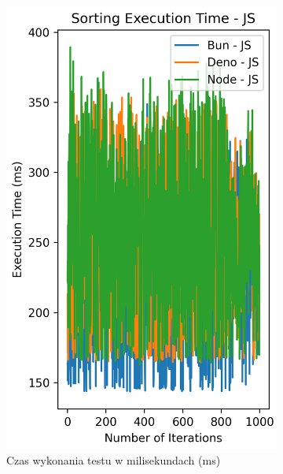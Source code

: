 \begin{figure}[H]
  \centering
  \begin{subfigure}[b]{0.4\textwidth}
    \centering
    \includegraphics[width=\textwidth]{Figures/sorting/sorting_bubble_1000_10000_js_time.png}
    \caption{Czas wykonania testu w milisekundach (ms)}
    \label{fig:bubble_sorting_e3_time}
  \end{subfigure}
  \begin{subfigure}[b]{0.4\textwidth}
    \centering

\end{subfigure}
\end{figure}
